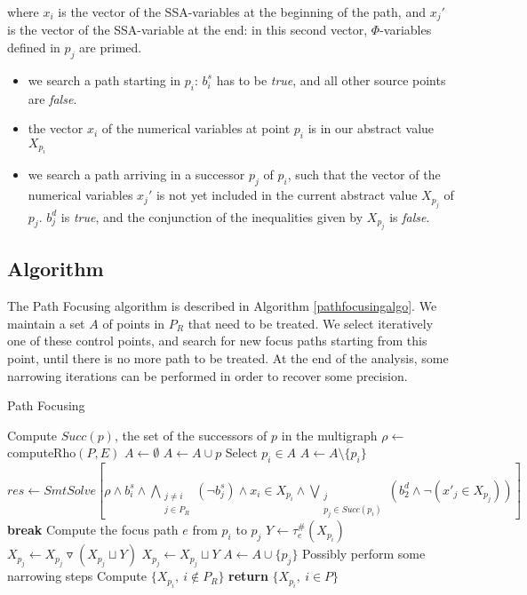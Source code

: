 \documentclass[a4paper,english,titlepage,11pt]{report}
\newcommand{\widening}{\mathop{\triangledown}}
\begin{document}
	where $x_i$ is the vector of the SSA-variables at the beginning of the path,
	and $x_j'$ is the vector of the SSA-variable at the end: in this second
	vector, $\Phi$-variables defined in $p_j$ are primed.

	\begin{itemize}
	\item we search a path starting in $p_i$: $b_i^s$ has to be \emph{true}, and
	all other source points are \emph{false}.
	\item the vector $x_i$ of the numerical variables at point $p_i$ is in our
	abstract value $X_{p_i}$
	\item we search a path arriving in a successor $p_j$ of $p_i$, such that the
	vector of the numerical variables $x_j'$ is not yet included in the current
	abstract value $X_{p_j}$ of $p_j$. $b_j^d$ is \emph{true}, and the
	conjunction of the inequalities given by $X_{p_j}$ is \emph{false}.
	\end{itemize}

	\subsection{Algorithm}
	
	The Path Focusing algorithm is described in Algorithm \ref{pathfocusingalgo}.
	We maintain a set $A$ of points in $P_R$ that need to be treated.
	We select iteratively one of these control points, and search for new focus
	paths starting from this point, until there is no more path to be treated.
	At the end of the analysis, some narrowing iterations can be performed in
	order to recover some precision.
\begin{algorithm}
\caption{Path Focusing}\label{pathfocusingalgo}
\begin{algorithmic}[1] 
	\State Compute $Succ(p)$, the set of the successors of $p$ in the multigraph
\EndFor
\State $\rho \gets$ computeRho$(P,E)$
\State $A \gets \emptyset$
	\State $A \gets A \cup p$
\EndFor
{}
	\State Select $p_i \in A$
	\State $A \gets A \setminus \{p_i\}$
		\State $res \gets SmtSolve\left[\rho \wedge b_i^s \wedge
		\displaystyle\bigwedge_{\substack{j\neq i \\
		j\in P_R}} (\neg b_j^s) \wedge x_i \in X_{p_i} \wedge
		\bigvee_{\substack{j \\ p_j\in Succ(p_i)}} \left(b_2^d \wedge \neg (x'_j \in
		X_{p_j})\right)\right]$
			\State \textbf{break}
		\EndIf
		\State Compute the focus path $e$ from $p_i$ to $p_j$
		\State $Y \gets \tau_e^\#(X_{p_i})$
			\State $X_{p_j} \gets X_{p_j} \widening (X_{p_j} \sqcup Y)$
		\Else
			\State $X_{p_j} \gets X_{p_j} \sqcup Y$
		\EndIf
		\State $A \gets A \cup \{p_j\}$
	\EndWhile
\EndWhile
\State Possibly perform some narrowing steps
\State Compute $\{X_{p_i},\ i \notin P_R\}$
\State \textbf{return} $\{X_{p_i},\ i \in P\}$
\EndProcedure
\end{algorithmic}
\end{algorithm}
\end{document}
